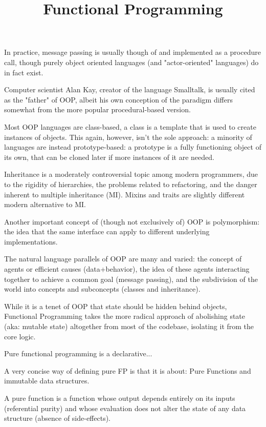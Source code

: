In practice, message passing is usually though of and implemented as a procedure call, though purely object oriented languages (and "actor-oriented" languages) do in fact exist.

Computer scientist Alan Kay, creator of the language Smalltalk, is usually cited as the "father" of OOP, albeit his own conception of the paradigm differs somewhat from the more popular procedural-based version.

Most OOP languages are class-based, a class is a template that is used to create instances of objects. This again, however, isn't the sole approach: a minority of languages are instead prototype-based: a prototype is a fully functioning object of its own, that can be cloned later if more instances of it are needed.

Inheritance is a moderately controversial topic among modern programmers, due to the rigidity of hierarchies, the problems related to refactoring, and the danger inherent to multiple inheritance (MI). Mixins and traits are slightly different modern alternative to MI.

Another important concept of (though not exclusively of) OOP is polymorphism: the idea that the same interface can apply to different underlying implementations.

The natural language parallels of OOP are many and varied: the concept of agents or efficient causes (data+behavior), the idea of these agents interacting together to achieve a common goal (message passing), and the subdivision of the world into concepts and subconcepts (classes and inheritance).



\title{Functional Programming}

While it is a tenet of OOP that state should be hidden behind objects, Functional Programming takes the more radical approach of abolishing state (aka: mutable state) altogether from most of the codebase, isolating it from the core logic.

Pure functional programming is a declarative...

A very concise way of defining pure FP is that it is about: Pure Functions and immutable data structures.

A pure function is a function whose output depends entirely on its inputs (referential purity) and whose evaluation does not alter the state of any data structure (absence of side-effects).

